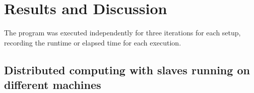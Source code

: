 \documentclass[journal]{./IEEE/IEEEtran}
\begin{document}
\section{Results and Discussion}
The program was executed independently for three iterations for each setup, recording the runtime or elapsed time for each execution.


\subsection{Distributed computing with slaves running on different machines}
\end{document}
